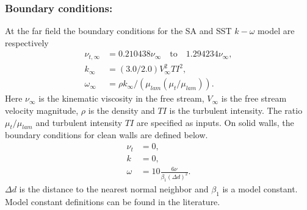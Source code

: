  \subsubsection{Boundary conditions:}
 At the far field the boundary conditions for the SA and SST $k-\omega$ model are respectively
\begin{eqnarray*}
 \nu_{t,\infty} &= 0.210438 \nu_{\infty}\quad \text{to}\quad 1.294234\nu_{\infty},\\ 
 k_{\infty}  &= (3.0/2.0)V_{\infty}^2 TI^{2},\\
 \omega_{\infty} &= \rho k_{\infty}/(\mu_{lam}(\mu_t/\mu_{lam})).
\end{eqnarray*}
Here $\nu_{\infty}$ is the kinematic viscosity in the free stream, $V_{\infty}$ is the free stream velocity magnitude, $\rho$ is the density and $TI$ is the turbulent intensity. The ratio $\mu_t/\mu_{lam}$ and turbulent intensity $TI$ are specified as inputs. 
On solid walls, the boundary conditions for clean walls are defined below. 
 \begin{eqnarray*}
 \nu_t &= 0, \\
  k &= 0, \\
  \omega &= 10 \frac{6 \nu}{\beta_1(\Delta d)^2}.
 \end{eqnarray*}{}
$\Delta d$ is the distance to the nearest normal neighbor and $\beta_1$ is a model constant.
Model constant definitions can be found in the literature\cite{SU22014, wilcox2006turbulence}.
